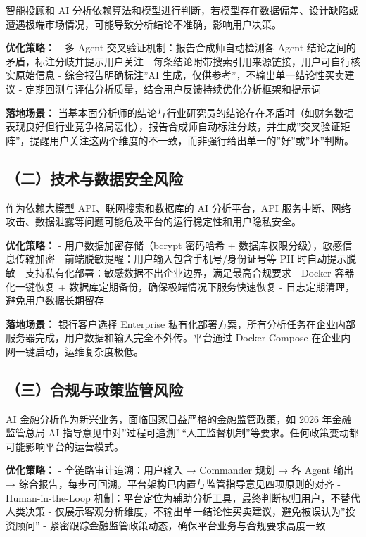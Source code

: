 \documentclass[
]{ctexart}
\begin{document}
智能投顾和 AI
分析依赖算法和模型进行判断，若模型存在数据偏差、设计缺陷或遭遇极端市场情况，可能导致分析结论不准确，影响用户决策。

\textbf{优化策略：} - 多 Agent 交叉验证机制：报告合成师自动检测各 Agent
结论之间的矛盾，标注分歧并提示用户关注 -
每条结论附带搜索引用来源链接，用户可自行核实原始信息 -
综合报告明确标注''AI 生成，仅供参考''，不输出单一结论性买卖建议 -
定期回测与评估分析质量，结合用户反馈持续优化分析框架和提示词

\textbf{落地场景：}
当基本面分析师的结论与行业研究员的结论存在矛盾时（如财务数据表现良好但行业竞争格局恶化），报告合成师自动标注分歧，并生成''交叉验证矩阵''，提醒用户关注这两个维度的不一致，而非强行给出单一的''好''或''坏''判断。

\subsection{（二）技术与数据安全风险}\label{ux4e8cux6280ux672fux4e0eux6570ux636eux5b89ux5168ux98ceux9669}

作为依赖大模型 API、联网搜索和数据库的 AI 分析平台，API
服务中断、网络攻击、数据泄露等问题可能危及平台的运行稳定性和用户隐私安全。

\textbf{优化策略：} - 用户数据加密存储（bcrypt 密码哈希 +
数据库权限分级），敏感信息传输加密 -
前端脱敏提醒：用户输入包含手机号/身份证号等 PII 时自动提示脱敏 -
支持私有化部署：敏感数据不出企业边界，满足最高合规要求 - Docker
容器化一键恢复 + 数据库定期备份，确保极端情况下服务快速恢复 -
日志定期清理，避免用户数据长期留存

\textbf{落地场景：} 银行客户选择 Enterprise
私有化部署方案，所有分析任务在企业内部服务器完成，用户数据和输入完全不外传。平台通过
Docker Compose 在企业内网一键启动，运维复杂度极低。

\subsection{（三）合规与政策监管风险}\label{ux4e09ux5408ux89c4ux4e0eux653fux7b56ux76d1ux7ba1ux98ceux9669}

AI 金融分析作为新兴业务，面临国家日益严格的金融监管政策，如 2026
年金融监管总局 AI
指导意见中对''过程可追溯''\,``人工监督机制''等要求。任何政策变动都可能影响平台的运营模式。

\textbf{优化策略：} - 全链路审计追溯：用户输入 → Commander 规划 → 各
Agent 输出 →
综合报告，每步可回溯。平台架构已内置与监管指导意见四项原则的对齐 -
Human-in-the-Loop
机制：平台定位为辅助分析工具，最终判断权归用户，不替代人类决策 -
仅展示客观分析维度，不输出单一结论性买卖建议，避免被误认为''投资顾问'' -
紧密跟踪金融监管政策动态，确保平台业务与合规要求高度一致
\end{document}
